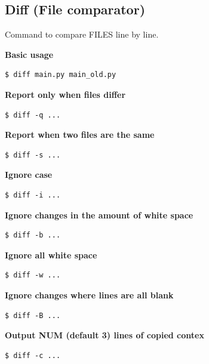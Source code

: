 \documentclass{article}
\newenvironment{codetemplate}[1][]{%
  \mybasecolorbox[#1]
  \itshape
}{%
  \endmybasecolorbox
}
\begin{document}
\subsection{Diff (File comparator)}
Command to compare FILES line by line.

\textbf{Basic usage}
\begin{codetemplate}{}
\begin{verbatim}
$ diff main.py main_old.py
\end{verbatim}
\end{codetemplate}

\textbf{Report only when files differ}
\begin{codetemplate}{}
\begin{verbatim}
$ diff -q ...
\end{verbatim}
\end{codetemplate}

\textbf{Report when two files are the same}
\begin{codetemplate}{}
\begin{verbatim}
$ diff -s ...
\end{verbatim}
\end{codetemplate}

\textbf{Ignore case}
\begin{codetemplate}{}
\begin{verbatim}
$ diff -i ...
\end{verbatim}
\end{codetemplate}

\textbf{Ignore changes in the amount of white space}
\begin{codetemplate}{}
\begin{verbatim}
$ diff -b ...
\end{verbatim}
\end{codetemplate}

\textbf{Ignore all white space}
\begin{codetemplate}{}
\begin{verbatim}
$ diff -w ...
\end{verbatim}
\end{codetemplate}

\textbf{Ignore changes where lines are all blank}
\begin{codetemplate}{}
\begin{verbatim}
$ diff -B ...
\end{verbatim}
\end{codetemplate}

\textbf{Output NUM (default 3) lines of copied contex}
\begin{codetemplate}{}
\begin{verbatim}
$ diff -c ...
\end{verbatim}
\end{codetemplate}
\end{document}
